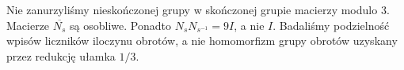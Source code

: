 \begin{uwaga}
Nie zanurzyliśmy nieskończonej grupy w skończonej grupie macierzy modulo $3$. Macierze $\overline{N_s}$ są osobliwe. Ponadto $N_sN_{s^{-1}}=9I$, a nie $I$. Badaliśmy podzielność wpisów liczników iloczynu obrotów, a nie homomorfizm grupy obrotów uzyskany przez redukcję ułamka $1/3$.
\end{uwaga}

